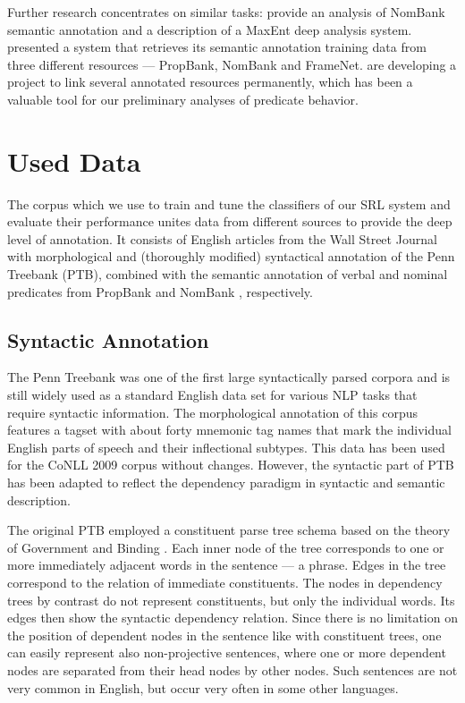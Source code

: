\documentclass[12pt,notitlepage]{report}
\begin{document}
Further research concentrates on similar tasks: \citet{jiang06} provide an analysis of NomBank \citep{meyers04} semantic annotation and a description of a MaxEnt deep analysis system. \citet{giuglea06} presented a system that retrieves its semantic annotation training data from three different resources --- PropBank, NomBank and FrameNet. \citet{loper07} are developing a project to link several annotated resources permanently, which has been a valuable tool for our preliminary analyses of predicate behavior. 

\chapter{Used Data}\label{data}

The corpus which we use to train and tune the classifiers of our SRL system and evaluate their performance \citep{surdeanu08,hajic09} unites data from different sources to provide the deep level of annotation. It consists of English articles from the Wall Street Journal with morphological and (thoroughly modified) syntactical annotation of the Penn Treebank (PTB), \citep{marcus93} combined with the semantic annotation of verbal and nominal predicates from PropBank \citep{palmer05} and NomBank \citep{meyers04}, respectively.

\section{Syntactic Annotation}

The Penn Treebank was one of the first large syntactically parsed corpora and is still widely used as a standard English data set for various NLP tasks that require syntactic information. The morphological annotation of this corpus features a tagset \citep{santorini90} with about forty mnemonic tag names that mark the individual English parts of speech and their inflectional subtypes. This data has been used for the CoNLL 2009 corpus without changes. However, the syntactic part of PTB has been adapted to reflect the dependency paradigm in syntactic and semantic description.

The original PTB employed a constituent parse tree schema based on the theory of Government and Binding \citep{chomsky81}. Each inner node of the tree corresponds to one or more immediately adjacent words in the sentence --- a phrase. Edges in the tree correspond to the relation of immediate constituents. The nodes in dependency trees by contrast do not represent constituents, but only the individual words. Its edges then show the syntactic dependency relation. Since there is no limitation on the position of dependent nodes in the sentence like with constituent trees, one can easily represent also non-projective sentences, where one or more dependent nodes are separated from their head nodes by other nodes. Such sentences are not very common in English, but occur very often in some other languages.
\end{document}
